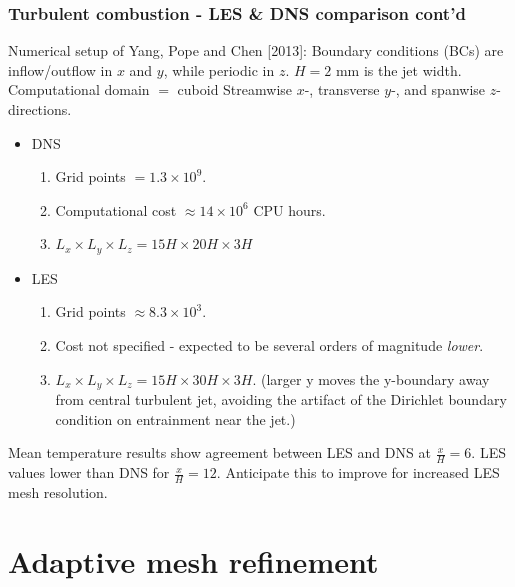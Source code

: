 \documentclass{beamer}
\begin{document}
\begin{frame}%
\frametitle{Turbulent combustion - LES \& DNS comparison cont'd}
Numerical setup of Yang, Pope and Chen [2013]:\newline
\tiny{
Boundary conditions (BCs) are inflow/outflow in $x$ and $y$, while periodic in $z$.\newline
$H = 2$ mm is the jet width.}\newline
Computational domain $=$ cuboid\newline
Streamwise $x$-, transverse $y$-, and spanwise $z$-directions.
\begin{itemize}
\scriptsize
\item DNS 
\begin{enumerate}[(1)]
\scriptsize
\item Grid points $ = 1.3 \times 10^9$.  
\item Computational cost $\approx 14 \times 10^6$ CPU hours.
\item $L_x \times L_y \times L_z = 15H \times 20H \times 3H$ 
\end{enumerate}
\item LES
\begin{enumerate}[(1)]
\scriptsize
\item Grid points $ \approx 8.3 \times 10^3$.  
\item Cost not specified - expected to be several orders of magnitude \textit{lower}.
\item $ L_x \times L_y \times L_z = 15H \times 30H \times 3H$. \newline \tiny{(larger y moves the y-boundary away from central turbulent jet, avoiding the artifact of the Dirichlet boundary condition on entrainment near the jet.)}
\end{enumerate}
\end{itemize}
\vspace{10pt}
\scriptsize
Mean temperature results show agreement between LES and DNS at $\frac{x}{H} = 6$. \newline LES values lower than DNS for $\frac{x}{H} = 12$.\newline
Anticipate this to improve for increased LES mesh resolution.

\end{frame}


\section[AMR]{Adaptive mesh refinement}
\end{document}
